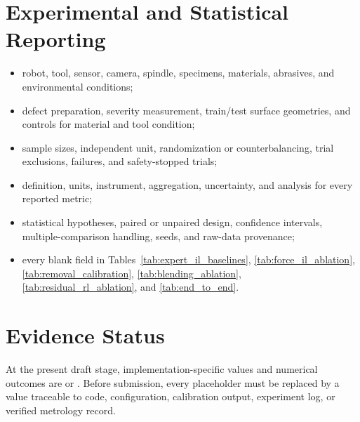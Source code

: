 \section{Experimental and Statistical Reporting}
\begin{itemize}
  \item robot, tool, sensor, camera, spindle, specimens, materials, abrasives, and environmental conditions;
  \item defect preparation, severity measurement, train/test surface geometries, and controls for material and tool condition;
  \item sample sizes, independent unit, randomization or counterbalancing, trial exclusions, failures, and safety-stopped trials;
  \item definition, units, instrument, aggregation, uncertainty, and analysis for every reported metric;
  \item statistical hypotheses, paired or unpaired design, confidence intervals, multiple-comparison handling, seeds, and raw-data provenance;
  \item every blank field in Tables~\ref{tab:expert_il_baselines}, \ref{tab:force_il_ablation}, \ref{tab:removal_calibration}, \ref{tab:blending_ablation}, \ref{tab:residual_rl_ablation}, and \ref{tab:end_to_end}.
\end{itemize}

\section{Evidence Status}
At the present draft stage, implementation-specific values and numerical outcomes are  or . Before submission, every placeholder must be replaced by a value traceable to code, configuration, calibration output, experiment log, or verified metrology record.
